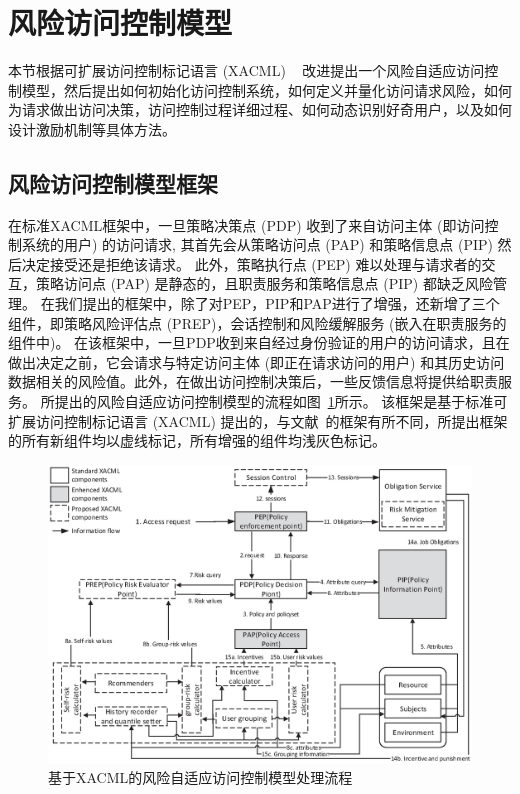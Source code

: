\section{风险访问控制模型}
\label{sec:proposed model}
本节根据可扩展访问控制标记语言 (XACML) ~\cite{verma2004xml} 改进提出一个风险自适应访问控制模型，然后提出如何初始化访问控制系统，如何定义并量化访问请求风险，如何为请求做出访问决策，访问控制过程详细过程、如何动态识别好奇用户，以及如何设计激励机制等具体方法。

\subsection{风险访问控制模型框架}
\label{subsec:framework}

在标准XACML框架中，一旦策略决策点 (PDP) 收到了来自访问主体 (即访问控制系统的用户) 的访问请求, 其首先会从策略访问点 (PAP) 和策略信息点 (PIP) 然后决定接受还是拒绝该请求。 此外，策略执行点 (PEP) 难以处理与请求者的交互，策略访问点 (PAP) 是静态的，且职责服务和策略信息点 (PIP) 都缺乏风险管理。
在我们提出的框架中，除了对PEP，PIP和PAP进行了增强，还新增了三个组件，即策略风险评估点 (PREP)，会话控制和风险缓解服务 (嵌入在职责服务的组件中)。 在该框架中，一旦PDP收到来自经过身份验证的用户的访问请求，且在做出决定之前，它会请求与特定访问主体 (即正在请求访问的用户) 和其历史访问数据相关的风险值。此外，在做出访问控制决策后，一些反馈信息将提供给职责服务。 所提出的风险自适应访问控制模型的流程如图~\ref{fig:Process_flow}所示。 该框架是基于标准可扩展访问控制标记语言 (XACML) 提出的，与文献~\cite{shaikh2012dynamic}的框架有所不同，所提出框架的所有新组件均以虚线标记，所有增强的组件均浅灰色标记。


\begin{figure}[htbp]
	\includegraphics[width=\linewidth]{./figures/Process_flow.eps}
	\caption{基于XACML的风险自适应访问控制模型处理流程}
	\label{fig:Process_flow}
\end{figure}

